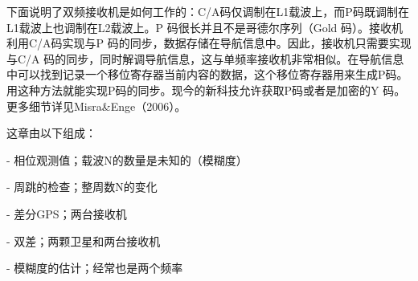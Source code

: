 下面说明了双频接收机是如何工作的：C/A码仅调制在L1载波上，而P码既调制在L1载波上也调制在L2载波上。P 码很长并且不是哥德尔序列（Gold 码）。接收机利用C/A码实现与P 码的同步，数据存储在导航信息中。因此，接收机只需要实现与C/A 码的同步，同时解调导航信息，这与单频率接收机非常相似。在导航信息中可以找到记录一个移位寄存器当前内容的数据，这个移位寄存器用来生成P码。用这种方法就能实现P码的同步。现今的新科技允许获取P码或者是加密的Y 码。更多细节详见Misra\&Enge（2006）。

这章由以下组成：

- 相位观测值；载波N的数量是未知的（模糊度）

- 周跳的检查；整周数N的变化

- 差分GPS；两台接收机

- 双差；两颗卫星和两台接收机

- 模糊度的估计；经常也是两个频率